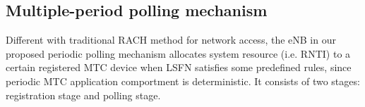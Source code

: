 
\subsection{Multiple-period polling mechanism}

Different with traditional RACH method for network access, the eNB in our proposed periodic polling mechanism allocates system resource (i.e. RNTI) to a certain registered MTC device when LSFN satisfies some predefined rules, since periodic MTC application comportment is deterministic. It consists of two stages: registration stage and polling stage. 

